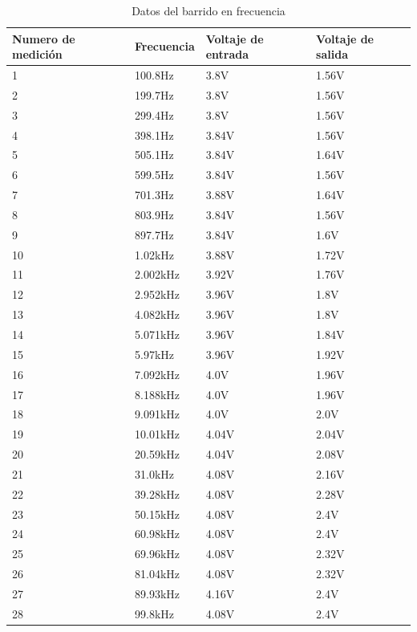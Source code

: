 \documentclass[letterpaper,spanish,12pt]{report}
\begin{document}
\begin{table}[h]
	\centering
		\begin{tabular}{|l|l|l|l|}
			\hline
			Numero de medici\'on & Frecuencia & Voltaje de entrada & 			Voltaje de salida\\
			\hline \hline
			1 & 100.8Hz & 3.8V & 1.56V \\
			\hline
			2 & 199.7Hz & 3.8V & 1.56V \\
			\hline
			3 & 299.4Hz & 3.8V & 1.56V \\
			\hline
			4 & 398.1Hz & 3.84V & 1.56V \\
			\hline
			5 & 505.1Hz & 3.84V & 1.64V \\
			\hline
			6 & 599.5Hz & 3.84V & 1.56V \\
			\hline
			7 & 701.3Hz & 3.88V & 1.64V \\
			\hline
			8 & 803.9Hz & 3.84V & 1.56V \\
			\hline
			9 & 897.7Hz & 3.84V & 1.6V \\
			\hline
			10 & 1.02kHz & 3.88V & 1.72V \\
			\hline
			11 & 2.002kHz & 3.92V & 1.76V \\
			\hline
			12 & 2.952kHz & 3.96V & 1.8V \\
			\hline
			13 & 4.082kHz & 3.96V & 1.8V \\
			\hline
			14 & 5.071kHz & 3.96V & 1.84V \\
			\hline
			15 & 5.97kHz & 3.96V & 1.92V \\
			\hline
			16 & 7.092kHz & 4.0V & 1.96V \\
			\hline
			17 & 8.188kHz & 4.0V & 1.96V \\
			\hline
			18 & 9.091kHz & 4.0V & 2.0V \\
			\hline
			19 & 10.01kHz & 4.04V & 2.04V \\
			\hline
			20 & 20.59kHz & 4.04V & 2.08V \\
			\hline
			21 & 31.0kHz & 4.08V & 2.16V \\
			\hline
			22 & 39.28kHz & 4.08V & 2.28V \\
			\hline
			23 & 50.15kHz & 4.08V & 2.4V \\
			\hline
			24 & 60.98kHz & 4.08V & 2.4V \\
			\hline
			25 & 69.96kHz & 4.08V & 2.32V \\
			\hline
			26 & 81.04kHz & 4.08V & 2.32V \\
			\hline
			27 & 89.93kHz & 4.16V & 2.4V \\
			\hline
			28 & 99.8kHz & 4.08V & 2.4V \\
			\hline
		\end{tabular}
	\caption{Datos del barrido en frecuencia}
	\label{tab:1}
\end{table}
\end{document}
